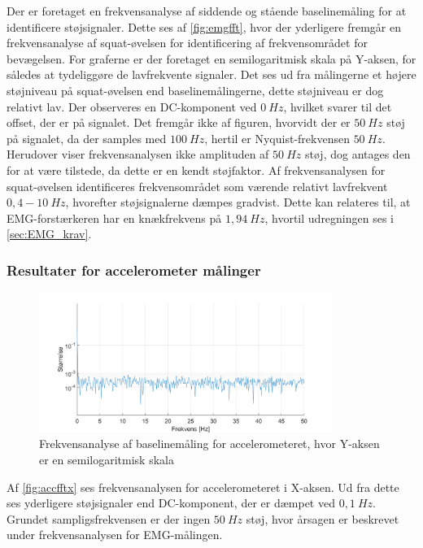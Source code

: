 Der er foretaget en frekvensanalyse af siddende og stående baselinemåling for at identificere støjsignaler. Dette ses af \autoref{fig:emgfft}, hvor der yderligere fremgår en frekvensanalyse af squat-øvelsen for identificering af frekvensområdet for bevægelsen. For graferne er der foretaget en semilogaritmisk skala på Y-aksen, for således at tydeliggøre de lavfrekvente signaler. Det ses ud fra målingerne et højere støjniveau på squat-øvelsen end baselinemålingerne, dette støjniveau er dog relativt lav. 
Der observeres en DC-komponent ved $0~Hz$, hvilket svarer til det offset, der er på signalet. 
Det fremgår ikke af figuren, hvorvidt der er $50~Hz$ støj på signalet, da der samples med $100~Hz$, hertil er Nyquist-frekvensen $50~Hz$. Herudover viser frekvensanalysen ikke amplituden af $50~Hz$ støj, dog antages den for at være tilstede, da dette er en kendt støjfaktor. 
Af frekvensanalysen for squat-øvelsen identificeres frekvensområdet som værende relativt lavfrekvent $0,4-10~Hz$, hvorefter støjsignalerne dæmpes gradvist. Dette kan relateres til, at EMG-forstærkeren har en knækfrekvens på $1,94~Hz$, hvortil udregningen ses i \autoref{sec:EMG_krav}. 


\subsubsection{Resultater for accelerometer målinger} \label{sec:acc_fft}

\begin{figure}[H]
	\centering
	\includegraphics[width=0.85\textwidth]{figures/Pilotforsoeg/accfft.png}
	\caption{Frekvensanalyse af baselinemåling for accelerometeret, hvor Y-aksen er en semilogaritmisk skala}
	\label{fig:accfftx}
\end{figure}
Af \autoref{fig:accfftx} ses frekvensanalysen for accelerometeret i X-aksen. Ud fra dette ses yderligere støjsignaler end DC-komponent, der er dæmpet ved $0,1~Hz$. Grundet sampligsfrekvensen er der ingen $50~Hz$ støj, hvor årsagen er beskrevet under frekvensanalysen for EMG-målingen. 

